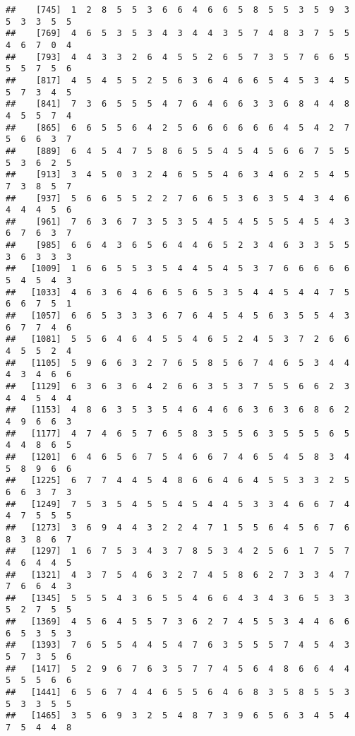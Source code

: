 \documentclass[
]{book}
\begin{document}
\begin{verbatim}
##    [745]  1  2  8  5  5  3  6  6  4  6  6  5  8  5  5  3  5  9  3  5  3  3  5  5
##    [769]  4  6  5  3  5  3  4  3  4  4  3  5  7  4  8  3  7  5  5  4  6  7  0  4
##    [793]  4  4  3  3  2  6  4  5  5  2  6  5  7  3  5  7  6  6  5  5  5  7  5  6
##    [817]  4  5  4  5  5  2  5  6  3  6  4  6  6  5  4  5  3  4  5  5  7  3  4  5
##    [841]  7  3  6  5  5  5  4  7  6  4  6  6  3  3  6  8  4  4  8  4  5  5  7  4
##    [865]  6  6  5  5  6  4  2  5  6  6  6  6  6  6  4  5  4  2  7  5  6  6  3  7
##    [889]  6  4  5  4  7  5  8  6  5  5  4  5  4  5  6  6  7  5  5  5  3  6  2  5
##    [913]  3  4  5  0  3  2  4  6  5  5  4  6  3  4  6  2  5  4  5  7  3  8  5  7
##    [937]  5  6  6  5  5  2  2  7  6  6  5  3  6  3  5  4  3  4  6  4  4  4  5  6
##    [961]  7  6  3  6  7  3  5  3  5  4  5  4  5  5  5  4  5  4  3  6  7  6  3  7
##    [985]  6  6  4  3  6  5  6  4  4  6  5  2  3  4  6  3  3  5  5  3  6  3  3  3
##   [1009]  1  6  6  5  5  3  5  4  4  5  4  5  3  7  6  6  6  6  6  5  4  5  4  3
##   [1033]  4  6  3  6  4  6  6  5  6  5  3  5  4  4  5  4  4  7  5  6  6  7  5  1
##   [1057]  6  6  5  3  3  3  6  7  6  4  5  4  5  6  3  5  5  4  3  6  7  7  4  6
##   [1081]  5  5  6  4  6  4  5  5  4  6  5  2  4  5  3  7  2  6  6  4  5  5  2  4
##   [1105]  5  9  6  6  3  2  7  6  5  8  5  6  7  4  6  5  3  4  4  4  3  4  6  6
##   [1129]  6  3  6  3  6  4  2  6  6  3  5  3  7  5  5  6  6  2  3  4  4  5  4  4
##   [1153]  4  8  6  3  5  3  5  4  6  4  6  6  3  6  3  6  8  6  2  4  9  6  6  3
##   [1177]  4  7  4  6  5  7  6  5  8  3  5  5  6  3  5  5  5  6  5  4  4  8  6  5
##   [1201]  6  4  6  5  6  7  5  4  6  6  7  4  6  5  4  5  8  3  4  5  8  9  6  6
##   [1225]  6  7  7  4  4  5  4  8  6  6  4  6  4  5  5  3  3  2  5  6  6  3  7  3
##   [1249]  7  5  3  5  4  5  5  4  5  4  4  5  3  3  4  6  6  7  4  4  7  5  5  5
##   [1273]  3  6  9  4  4  3  2  2  4  7  1  5  5  6  4  5  6  7  6  8  3  8  6  7
##   [1297]  1  6  7  5  3  4  3  7  8  5  3  4  2  5  6  1  7  5  7  4  6  4  4  5
##   [1321]  4  3  7  5  4  6  3  2  7  4  5  8  6  2  7  3  3  4  7  7  6  6  4  3
##   [1345]  5  5  5  4  3  6  5  5  4  6  6  4  3  4  3  6  5  3  3  5  2  7  5  5
##   [1369]  4  5  6  4  5  5  7  3  6  2  7  4  5  5  3  4  4  6  6  6  5  3  5  3
##   [1393]  7  6  5  5  4  4  5  4  7  6  3  5  5  5  7  4  5  4  3  5  7  3  5  6
##   [1417]  5  2  9  6  7  6  3  5  7  7  4  5  6  4  8  6  6  4  4  5  5  5  6  6
##   [1441]  6  5  6  7  4  4  6  5  5  6  4  6  8  3  5  8  5  5  3  5  3  3  5  5
##   [1465]  3  5  6  9  3  2  5  4  8  7  3  9  6  5  6  3  4  5  4  7  5  4  4  8

\end{verbatim}
\end{document}
